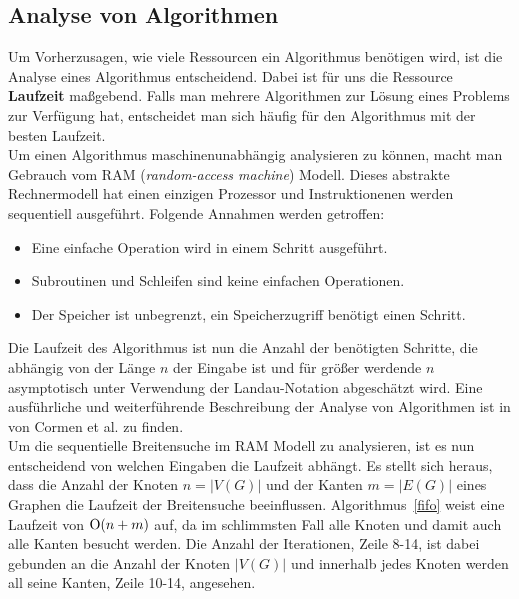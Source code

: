 \documentclass[11pt,a4paper]{article}
\begin{document}
\subsection{Analyse von Algorithmen}
Um Vorherzusagen, wie viele Ressourcen ein Algorithmus benötigen wird, ist die Analyse eines Algorithmus entscheidend. Dabei ist für uns die Ressource \textbf{Laufzeit} maßgebend. Falls man mehrere Algorithmen zur Lösung eines Problems zur Verfügung hat, entscheidet man sich häufig für den Algorithmus mit der besten Laufzeit.\\
Um einen Algorithmus maschinenunabhängig analysieren zu können, macht man Gebrauch vom RAM (\textit{random-access machine}) Modell. Dieses abstrakte Rechnermodell hat einen einzigen Prozessor und Instruktionenen werden sequentiell ausgeführt. Folgende Annahmen werden getroffen:
\begin{itemize}
	\item{Eine einfache Operation wird in einem Schritt ausgeführt.}
	\item{Subroutinen und Schleifen sind keine einfachen Operationen.}
	\item{Der Speicher ist unbegrenzt, ein Speicherzugriff benötigt einen Schritt.}
\end{itemize}
Die Laufzeit des Algorithmus ist nun die Anzahl der benötigten Schritte, die abhängig von der Länge \(n\) der Eingabe ist und für größer werdende \(n\) asymptotisch unter Verwendung der Landau-Notation abgeschätzt wird. Eine ausführliche und weiterführende Beschreibung der Analyse von Algorithmen ist in \cite{cormen_introduction_2009} von Cormen et al. zu finden.\\
Um die sequentielle Breitensuche im RAM Modell zu analysieren, ist es nun entscheidend von welchen Eingaben die Laufzeit abhängt. Es stellt sich heraus, dass die Anzahl der Knoten \(n = |V(G)|\) und der Kanten \(m = |E(G)|\) eines Graphen die Laufzeit der Breitensuche beeinflussen. Algorithmus~\ref{fifo} weist eine Laufzeit von \($O$(n + m)\) auf, da im schlimmsten Fall alle Knoten und damit auch alle Kanten besucht werden. Die Anzahl der Iterationen, Zeile 8-14, ist dabei gebunden an die Anzahl der Knoten \(|V(G)|\) und innerhalb jedes Knoten werden all seine Kanten, Zeile 10-14, angesehen. 
\end{document}
